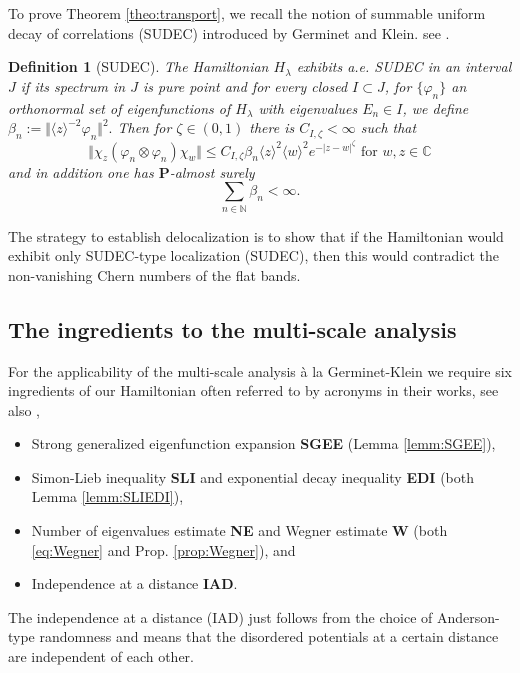 \documentclass[reqno,12pt,letterpaper]{amsart}
\newcommand{\CC}{{\mathbb C}}
\newtheorem{defi}[theo]{Definition}
\numberwithin{equation}{section}
\begin{document}
To prove Theorem \ref{theo:transport}, we recall the notion of summable uniform decay of correlations (SUDEC) introduced by Germinet and Klein. see \cite{GK06}.

\begin{defi}[SUDEC]
\label{defi:Sudec}
The Hamiltonian $H_{\lambda}$ exhibits a.e. \emph{SUDEC} in an interval $J$ if its spectrum in $J$ is pure point and for every closed $I \subset J$, for $\{\varphi_{n}\}$ an orthonormal set of eigenfunctions of $H_{\lambda}$ with eigenvalues $E_{n} \in I$, we define $\beta_{n}:=\Vert \langle z \rangle^{-2} \varphi_{n} \Vert^2.$ Then for $\zeta \in (0,1)$ there is $C_{I, \zeta} < \infty$ such that
\[\Vert \chi_z (\varphi_{n} \otimes \varphi_{n}) \chi_w \Vert \le C_{I, \zeta} \beta_{n} \langle z \rangle^2\langle w \rangle^2  e^{-\vert z-w \vert^{\zeta}}\text{ for }w,z\in \CC\]
and in addition one has $\mathbf P$-almost surely
\begin{equation}
\label{eq:SUDEC}
\sum_{n \in \mathbb N} \beta_{n}  < \infty.
\end{equation}
\end{defi}

The strategy to establish delocalization is to show that if the Hamiltonian would exhibit only SUDEC-type localization (SUDEC), then this would contradict the non-vanishing Chern numbers of the flat bands.
\subsection{The ingredients to the multi-scale analysis}
For the applicability of the multi-scale analysis \`a la Germinet-Klein we require six ingredients of our Hamiltonian often referred to by acronyms in their works, see also \cite{GK01},
\begin{itemize}
\item Strong generalized eigenfunction expansion {\bf{SGEE}} (Lemma \ref{lemm:SGEE}), 
\item Simon-Lieb inequality {\bf{SLI}} and exponential decay inequality {\bf{EDI}} (both Lemma \ref{lemm:SLIEDI}), 
\item Number of eigenvalues estimate {\bf{NE}} and Wegner estimate {\bf{W}} (both \eqref{eq:Wegner} and Prop.  \ref{prop:Wegner}), and 
\item Independence at a distance {\bf{IAD}}.
\end{itemize} 
The independence at a distance (IAD) just follows from the choice of Anderson-type randomness and means that the disordered potentials at a certain distance are independent of each other.
\end{document}
